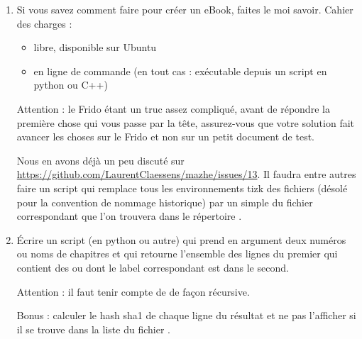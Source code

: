 \begin{enumerate}
    \item
        Si vous savez comment faire  pour créer un eBook, faites le moi savoir. Cahier des charges :
        \begin{itemize}
            \item libre, disponible sur Ubuntu
            \item en ligne de commande (en tout cas : exécutable depuis un script en python ou C++)
        \end{itemize}
        Attention : le Frido étant un truc assez compliqué, avant de répondre la première chose qui vous passe par la tête, assurez-vous que votre solution fait avancer les choses sur le Frido et non sur un petit document de test.

        Nous en avons déjà un peu discuté sur \url{https://github.com/LaurentClaessens/mazhe/issues/13}. Il faudra entre autres faire un script qui remplace tous les environnements tizk des fichiers  (désolé pour la convention de nommage historique) par un simple  du fichier  correspondant que l'on trouvera dans le répertoire .
    \item
        Écrire un script (en python ou autre) qui prend en argument deux numéros ou noms de chapitres et qui retourne l'ensemble des lignes du premier qui contient des  ou  dont le label correspondant est dans le second.

        Attention : il faut tenir compte de  de façon récursive.

        Bonus : calculer le hash sha1 de chaque ligne du résultat et ne pas l'afficher si il se trouve dans la liste du fichier .
\end{enumerate}
